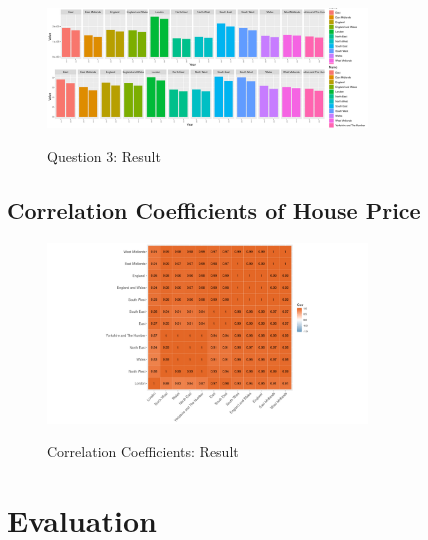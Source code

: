 \documentclass{article}
\begin{document}
\begin{figure}[htb]
  \begin{minipage}[b]{1.0\linewidth}
    \centering
    \centerline{\includegraphics[width=8.5cm]{Q3Geom_gridbar}}
    \centerline{Question 3: Result}\medskip
  \end{minipage}
\end{figure}

\subsection{Correlation Coefficients of House Price}

\begin{figure}[htb]
  \begin{minipage}[b]{1.0\linewidth}
    \centering
    \centerline{\includegraphics[width=8.5cm]{corHeatMap}}
    \centerline{Correlation Coefficients: Result}\medskip
  \end{minipage}
\end{figure}




\section{Evaluation}



\vfill\pagebreak
\printbibliography
\end{document}
